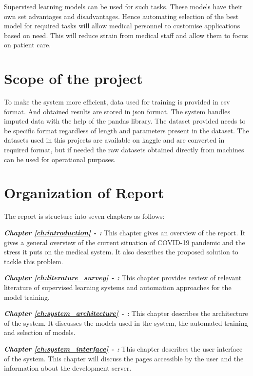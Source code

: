 Supervised learning models can be used for such tasks. These models have their own set
advantages and disadvantages. Hence automating selection of the best model for required tasks
will allow medical personnel to customise applications based on need. This will reduce strain
from medical staff and allow them to focus on patient care.

\section{Scope of the project} \label{sec:scope_of_the_project}

To make the system more efficient, data used for training is provided in csv format. And
obtained results are stored in json format. The system handles imputed data with the help of
the pandas library. The dataset provided needs to be specific format regardless of length and
parameters present in the dataset. The datasets used in this projects are available on kaggle
and are converted in required format, but if needed the raw datasets obtained directly from
machines can be used for operational purposes.

\section{Organization of Report} \label{sec:organization_of_report}

The report is structure into seven chapters as follows:

\textbf{\textit{Chapter \ref{ch:introduction} - :}}
This chapter gives an overview of the report. It gives a general overview of the current
situation of COVID-19 pandemic and the stress it puts on the medical system. It also describes
the proposed solution to tackle this problem.

\textbf{\textit{Chapter \ref{ch:literature_survey} - :}}
This chapter provides review of relevant literature of supervised learning systems and
automation approaches for the model training.

\textbf{\textit{Chapter \ref{ch:system_architecture} - :}}
This chapter describes the architecture of the system. It discusses the models used in the
system, the automated training and selection of models.

\textbf{\textit{Chapter \ref{ch:system_interface} - :}}
This chapter describes the user interface of the system. This chapter will discuss the pages
accessible by the user and the information about the development server.

